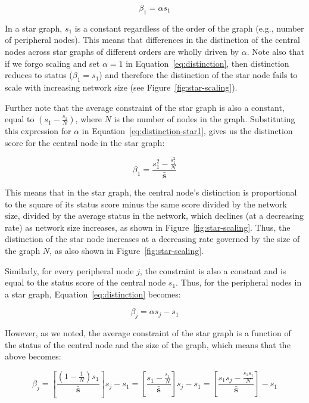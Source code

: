 \documentclass[12pt]{article}
\begin{document}
\begin{equation}
    \beta_1 = \alpha s_1
    \label{eq:distinction-star1}
\end{equation}

In a star graph, $s_1$ is a constant regardless of the order of the graph (e.g., number of peripheral nodes). This means that differences in the distinction of the central nodes across star graphs of different orders are wholly driven by $\alpha$. Note also that if we forgo scaling and set $\alpha = 1$ in Equation~\ref{eq:distinction}, then distinction reduces to status ($\beta_1 = s_1$) and therefore the distinction of the star node fails to scale with increasing network size (see Figure~\ref{fig:star-scaling}).

Further note that the average constraint of the star graph is also a constant, equal to $\left(s_1-\frac{s_1}{N}\right)$, where $N$ is the number of nodes in the graph. Substituting this expression for $\alpha$ in Equation~\ref{eq:distinction-star1}, gives us the distinction score for the central node in the star graph:

\begin{equation}
    \beta_1 =\frac{s_1^2-\frac{s_1^2}{N}}{\bar{\mathbf{s}}}
    \label{eq:distinction-star1}
\end{equation}

This means that in the star graph, the central node's distinction is proportional to the square of its status score minus the same score divided by the network size, divided by the average status in the network, which declines (at a decreasing rate) as network size increases, as shown in Figure~\ref{fig:star-scaling}. Thus, the distinction of the star node increases at a decreasing rate governed by the size of the graph $N$, as also shown in Figure~\ref{fig:star-scaling}. 

Similarly, for every peripheral node $j$, the constraint is also a constant and is equal to the status score of the central node $s_1$. Thus, for the peripheral nodes in a star graph, Equation~\ref{eq:distinction} becomes:

\begin{equation}
    \beta_j = \alpha s_j - s_1
    \label{eq:distinction-star}
\end{equation}

However, as we noted, the average constraint of the star graph is a function of the status of the central node and the size of the graph, which means that the above becomes:

\begin{equation}
    \beta_j = \left[\frac{\left(1-\frac{1}{N}\right)s_1}{\bar{\mathbf{s}}}\right]s_j-s_1 = \left[\frac{s_1 - \frac{s_1}{N}}{\bar{\mathbf{s}}}\right]s_j - s_1 = \left[\frac{s_1 s_j - \frac{s_1 s_j}{N}}{\bar{\mathbf{s}}} \right] - s_1
    \label{eq:distinction-star}
\end{equation}
\end{document}
